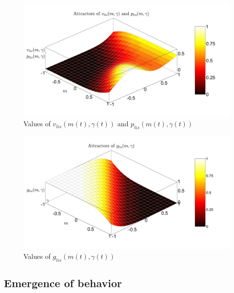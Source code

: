 \begin{figure}
  \centering
  \includegraphics[width=\linewidth]{figure/bifurcProsodyLis.pdf}
  \caption{Values of $v_{lis}(m(t),\gamma(t))$ and $p_{lis}(m(t),\gamma(t))$}
  \label{fig_pro_lis}
\end{figure}

\begin{figure}
  \centering
  \includegraphics[width=\linewidth]{figure/gazeLis.pdf}
  \caption{Values of $g_{lis}(m(t),\gamma(t))$}
  \label{fig_gaze_lis}
\end{figure}

\subsection{Emergence of behavior}


